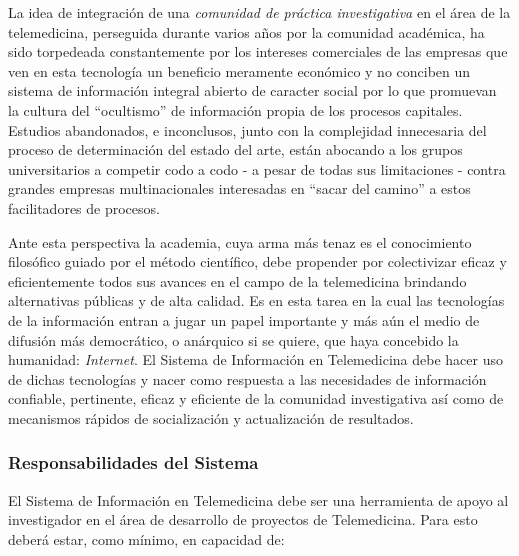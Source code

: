 La idea de integración de una \textit{comunidad de práctica investigativa} en el área de la telemedicina, perseguida durante varios años por la comunidad académica, ha sido torpedeada constantemente por los intereses comerciales de las empresas que ven en esta tecnología un beneficio meramente económico y no conciben un sistema de información integral abierto de caracter social por lo que promuevan la cultura del “ocultismo” de información propia de los procesos capitales. Estudios abandonados, e inconclusos, junto con la complejidad innecesaria del proceso de determinación del estado del arte, están abocando a los grupos universitarios a competir codo a codo - a pesar de todas sus limitaciones - contra grandes empresas multinacionales interesadas en “sacar del camino” a estos facilitadores de procesos.

Ante esta perspectiva la academia, cuya arma más tenaz es el conocimiento filosófico guiado por el método científico, debe propender por colectivizar eficaz y eficientemente todos sus avances en el campo de la telemedicina brindando alternativas públicas y de alta calidad. Es en esta tarea en la cual las tecnologías de la información entran a jugar un papel importante y más aún el medio de difusión más democrático, o anárquico si se quiere, que haya concebido la humanidad: \textit{Internet}. El Sistema de Información en Telemedicina debe hacer uso de dichas tecnologías y nacer como respuesta a las necesidades de información confiable, pertinente, eficaz y eficiente de la comunidad investigativa así como de mecanismos rápidos de socialización y actualización de resultados.

\subsubsection{Responsabilidades del Sistema}
El Sistema de Información en Telemedicina debe ser una herramienta de apoyo al investigador en el área de desarrollo de proyectos de Telemedicina. Para esto deberá estar, como mínimo, en capacidad de:

